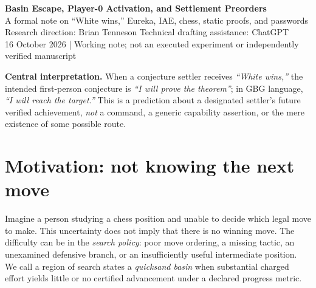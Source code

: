 \documentclass[11pt,letterpaper]{article}
\begin{document}
\begin{center}
{\Large\bfseries\color{ink} Basin Escape, Player-0 Activation, and Settlement Preorders}\\[5pt]
{\large A formal note on ``White wins,'' Eureka, IAE, chess, static proofs, and passwords}\\[12pt]
{\normalsize Research direction: Brian Tenneson \quad\textbullet\quad Technical drafting assistance: ChatGPT}\\[3pt]
{\small 16 October 2026 \quad | \quad Working note; not an executed experiment or independently verified manuscript}
\end{center}
\vspace{6pt}
\noindent\colorbox{pale}{\parbox{0.95\linewidth}{\textbf{Central interpretation.} When a conjecture settler receives \emph{``White wins,''} the intended first-person conjecture is \emph{``I will prove the theorem''}; in GBG language, \emph{``I will reach the target.''} This is a prediction about a designated settler's future verified achievement, \emph{not} a command, a generic capability assertion, or the mere existence of some possible route.}}\vspace{5pt}

\begin{abstract}
Consider an automated prover stalled in a search basin: it is unsure what to do next, just as a chess player may be unsure how to move. We formalize three proposed escape methods: (i) a Player-0-activated AMLD+0 federation investigating the first-person conjecture ``White wins,'' (ii) Eureka-style search for nontrivial intermediary lemmas, and (iii) Iterative Adaptive Eureka (IAE) search that revises these lemma-discovery attempts. Verified products enter a provenance-preserving shared BANK, and simulation-isomorphism classes (SICs) are ordered by an explicitly certificate-preserving simulation preorder. Under stated assumptions, settlement regions are upper sets and, in a well-founded quotient order, admit minimal-antichain generators. We separate three importantly different environments: chess has a \emph{moving adversary}; a fixed formal theory and theorem target do \emph{not}; a password may be fixed or may change in an adaptive challenge system. We additionally distinguish finite ordinary chess from a GBG+/formal search universe with potentially infinitely many proof targets and obstacles. All speedup claims remain hypotheses requiring resource-accounted experiments.
\end{abstract}

\section{Motivation: not knowing the next move}
Imagine a person studying a chess position and unable to decide which legal move to make. This uncertainty does not imply that there is no winning move. The difficulty can be in the \emph{search policy}: poor move ordering, a missing tactic, an unexamined defensive branch, or an insufficiently useful intermediate position. We call a region of search states a \emph{quicksand basin} when substantial charged effort yields little or no certified advancement under a declared progress metric.
\end{document}

